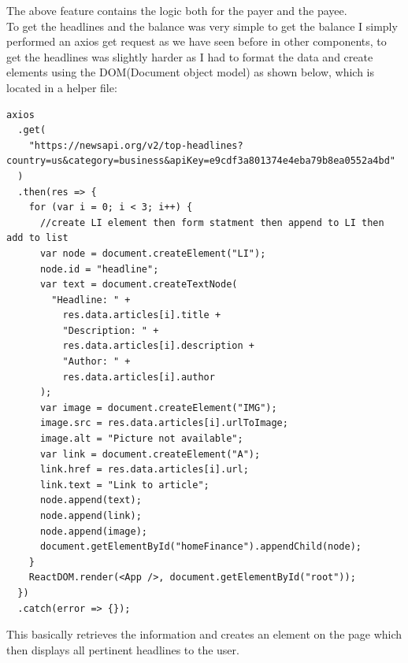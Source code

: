The above feature contains the logic both for the payer and the payee.
\\
To get the headlines and the balance was very simple to get the balance I simply performed an axios get request as we have seen before in other components, to get the headlines was slightly harder as I had to format the data and create elements using the DOM(Document object model) as shown below, which is located in a helper file:
\begin{verbatim}
axios
  .get(
    "https://newsapi.org/v2/top-headlines?country=us&category=business&apiKey=e9cdf3a801374e4eba79b8ea0552a4bd"
  )
  .then(res => {
    for (var i = 0; i < 3; i++) {
      //create LI element then form statment then append to LI then add to list
      var node = document.createElement("LI");
      node.id = "headline";
      var text = document.createTextNode(
        "Headline: " +
          res.data.articles[i].title +
          "Description: " +
          res.data.articles[i].description +
          "Author: " +
          res.data.articles[i].author
      );
      var image = document.createElement("IMG");
      image.src = res.data.articles[i].urlToImage;
      image.alt = "Picture not available";
      var link = document.createElement("A");
      link.href = res.data.articles[i].url;
      link.text = "Link to article";
      node.append(text);
      node.append(link);
      node.append(image);
      document.getElementById("homeFinance").appendChild(node);
    }
    ReactDOM.render(<App />, document.getElementById("root"));
  })
  .catch(error => {});
\end{verbatim}
This basically retrieves the information and creates an element on the page which then displays all pertinent headlines to the user.
\\

